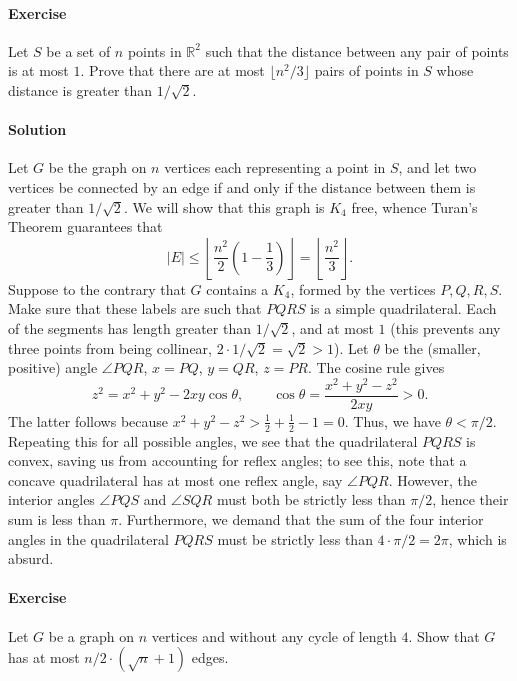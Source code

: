 \documentclass[10pt]{article}
\newcounter{prob}
\newcommand{\problem}{\stepcounter{prob}\paragraph{Exercise \arabic{prob}}}
\newcommand{\solution}{\paragraph{Solution}}
\newcommand{\R}{\mathbb{R}}
\begin{document}
    \problem Let $S$ be a set of $n$ points in $\R^2$ such that the distance between
    any pair of points is at most $1$. Prove that there are at most $\lfloor n^2 /
    3\rfloor$ pairs of points in $S$ whose distance is greater than $1 / \sqrt{2}$.

    \solution Let $G$ be the graph on $n$ vertices each representing a point in $S$,
    and let two vertices be connected by an edge if and only if the distance between
    them is greater than $1 / \sqrt{2}$. We will show that this graph is $K_4$ free,
    whence Turan's Theorem guarantees that \[
        |E| \leq \left\lfloor \frac{n^2}{2} \left(1 - \frac{1}{3}\right)\right\rfloor
        = \left\lfloor \frac{n^2}{3}\right\rfloor.
    \] Suppose to the contrary that $G$ contains a $K_4$, formed by the vertices $P,
    Q, R, S$. Make sure that these labels are such that $PQRS$ is a simple
    quadrilateral. Each of the segments has length greater than $1 / \sqrt{2}$, and
    at most $1$ (this prevents any three points from being collinear, $2\cdot 1 /
    \sqrt{2} = \sqrt{2} > 1$). Let $\theta$ be the (smaller, positive) angle $\angle
    PQR$, $x = PQ$, $y = QR$, $z = PR$.  The cosine rule gives \[
        z^2 = x^2 + y^2 - 2xy\cos\theta, \qquad \cos\theta = \frac{x^2 + y^2 -
        z^2}{2xy} > 0.
    \] The latter follows because $x^2 + y^2 - z^2 > \frac{1}{2} + \frac{1}{2} - 1 =
    0$. Thus, we have $\theta < \pi / 2$. Repeating this for all possible angles, we
    see that the quadrilateral $PQRS$ is convex, saving us from accounting for reflex
    angles; to see this, note that a concave quadrilateral has at most one reflex
    angle, say $\angle PQR$. However, the interior angles $\angle PQS$ and $\angle
    SQR$ must both be strictly less than $\pi / 2$, hence their sum is less than
    $\pi$.  Furthermore, we demand that the sum of the four interior angles in the
    quadrilateral $PQRS$ must be strictly less than $4\cdot \pi / 2 = 2\pi$, which is
    absurd.

    \problem Let $G$ be a graph on $n$ vertices and without any cycle of length $4$.
    Show that $G$ has at most $n / 2 \cdot (\sqrt{n} + 1)$ edges.
\end{document}
